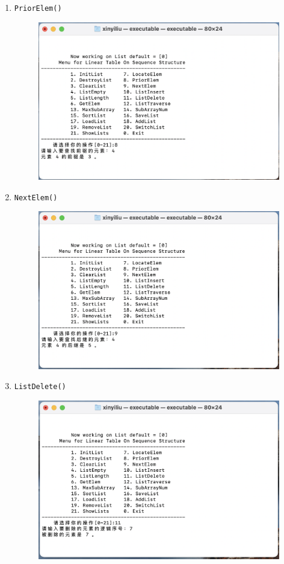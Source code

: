 \documentclass[supercite]{Experimental_Report}
\theoremstyle{definition}
\begin{document}
\begin{enumerate}
\newpage

\item \verb|PriorElem()|
	\begin{figure}[!htb]
		\includegraphics[width=0.8\linewidth]{images/截屏2023-06-01 18.22.56.png}
	\end{figure}
	\FloatBarrier

\item \verb|NextElem()|
	\begin{figure}[!htb]
		\includegraphics[width=0.8\linewidth]{images/截屏2023-06-01 18.23.17.png}
	\end{figure}
	\FloatBarrier
	
\newpage

\item \verb|ListDelete()|
	\begin{figure}[!htb]
		\includegraphics[width=0.8\linewidth]{images/截屏2023-06-01 18.23.53.png}
	\end{figure}
	\FloatBarrier


\end{enumerate}
\end{document}
